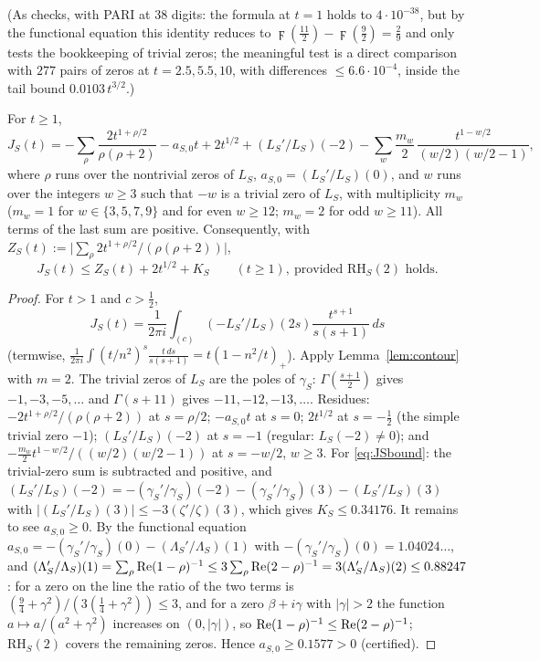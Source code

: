 (As checks, with PARI at 38 digits: the formula at $t=1$ holds to $4\cdot10^{-38}$, but by the functional equation this identity reduces to $\digamma(\frac{11}2)-\digamma(\frac92)=\frac29$ and only tests the bookkeeping of trivial zeros; the meaningful test is a direct comparison with $277$ pairs of zeros at $t=2.5,5.5,10$, with differences $\le6.6\cdot10^{-4}$, inside the tail bound $0.0103\,t^{3/2}$.)

\begin{lemma}\label{lem:JS}
For $t\ge1$,
\[
J_S(t)=-\sum_\rho\frac{2t^{1+\rho/2}}{\rho(\rho+2)}-a_{S,0}t+2t^{1/2}+(L_S'/L_S)(-2)-\sum_{w}\frac{m_w}2\,\frac{t^{1-w/2}}{(w/2)(w/2-1)},
\]
where $\rho$ runs over the nontrivial zeros of $L_S$, $a_{S,0}=(L_S'/L_S)(0)$, and $w$ runs over the integers $w\ge3$ such that $-w$ is a trivial zero of $L_S$, with multiplicity $m_w$ ($m_w=1$ for $w\in\{3,5,7,9\}$ and for even $w\ge12$; $m_w=2$ for odd $w\ge11$). All terms of the last sum are positive. Consequently, with $Z_S(t):=\bigl|\sum_\rho2t^{1+\rho/2}/(\rho(\rho+2))\bigr|$,
\begin{equation}\label{eq:JSbound}
J_S(t)\le Z_S(t)+2t^{1/2}+K_S\qquad(t\ge1),\ \text{provided }\mathrm{RH}_S(2)\text{ holds}.
\end{equation}
\end{lemma}

\begin{proof}
For $t>1$ and $c>\frac12$,
\[
J_S(t)=\frac1{2\pi i}\int_{(c)}(-L_S'/L_S)(2s)\frac{t^{s+1}}{s(s+1)}\,ds
\]
(termwise, $\frac1{2\pi i}\int(t/n^2)^s\frac{t\,ds}{s(s+1)}=t(1-n^2/t)_+$). Apply Lemma~\ref{lem:contour} with $m=2$. The trivial zeros of $L_S$ are the poles of $\gamma_S$: $\Gamma(\frac{s+1}2)$ gives $-1,-3,-5,\dots$ and $\Gamma(s+11)$ gives $-11,-12,-13,\dots$. Residues: $-2t^{1+\rho/2}/(\rho(\rho+2))$ at $s=\rho/2$; $-a_{S,0}t$ at $s=0$; $2t^{1/2}$ at $s=-\frac12$ (the simple trivial zero $-1$); $(L_S'/L_S)(-2)$ at $s=-1$ (regular: $L_S(-2)\ne0$); and $-\frac{m_w}2t^{1-w/2}/((w/2)(w/2-1))$ at $s=-w/2$, $w\ge3$. For \eqref{eq:JSbound}: the trivial-zero sum is subtracted and positive, and $(L_S'/L_S)(-2)=-(\gamma_S'/\gamma_S)(-2)-(\gamma_S'/\gamma_S)(3)-(L_S'/L_S)(3)$ with $|(L_S'/L_S)(3)|\le-3(\zeta'/\zeta)(3)$, which gives $K_S\le0.34176$. It remains to see $a_{S,0}\ge0$. By the functional equation $a_{S,0}=-(\gamma_S'/\gamma_S)(0)-(\Lambda_S'/\Lambda_S)(1)$ with $-(\gamma_S'/\gamma_S)(0)=1.04024\ldots$, and $(\Lambda_S'/\Lambda_S)(1)=\sum_\rho\operatorname{Re}(1-\rho)^{-1}\le3\sum_\rho\operatorname{Re}(2-\rho)^{-1}=3(\Lambda_S'/\Lambda_S)(2)\le0.88247$: for a zero on the line the ratio of the two terms is $(\frac94+\gamma^2)/(3(\frac14+\gamma^2))\le3$, and for a zero $\beta+i\gamma$ with $|\gamma|>2$ the function $a\mapsto a/(a^2+\gamma^2)$ increases on $(0,|\gamma|)$, so $\operatorname{Re}(1-\rho)^{-1}\le\operatorname{Re}(2-\rho)^{-1}$; $\mathrm{RH}_S(2)$ covers the remaining zeros. Hence $a_{S,0}\ge0.1577>0$ (certified).
\end{proof}

